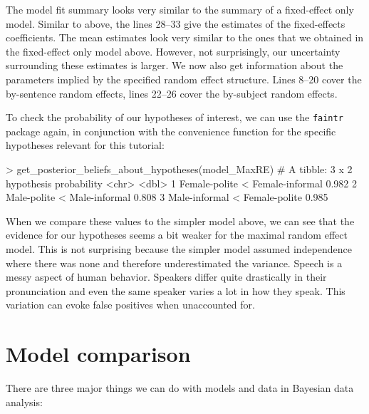 \documentclass[nobib]{tufte-handout}
\begin{document}
The model fit summary looks very similar to the summary of a fixed-effect only model. Similar to above, the lines 28--33 give the estimates of the fixed-effects coefficients. The mean estimates look very similar to the ones that we obtained in the fixed-effect only model above. However, not surprisingly, our uncertainty surrounding these estimates is larger.  
We now also get information about the parameters implied by the specified random effect
structure. Lines 8--20 cover the by-sentence random effects, lines 22--26 cover the by-subject
random effects.

To check the probability of our hypotheses of interest, we can use the \texttt{faintr} package again, in conjunction with the convenience function for the specific hypotheses relevant for this tutorial:

\medskip

\begin{minipage}[]{\textwidth}
\begin{rc}
> get_posterior_beliefs_about_hypotheses(model_MaxRE)
# A tibble: 3 x 2
  hypothesis                      probability
  <chr>                                 <dbl>
1 Female-polite < Female-informal       0.982
2 Male-polite < Male-informal           0.808
3 Male-informal < Female-polite         0.985
\end{rc}
\end{minipage}

When we compare these values to the simpler model above, we can see that the evidence for our
hypotheses seems a bit weaker for the maximal random effect model. This is not surprising
because the simpler model assumed independence where there was none and therefore
underestimated the variance. Speech is a messy aspect of human behavior. Speakers differ quite
drastically in their pronunciation and even the same speaker varies a lot in how they speak.
This variation can evoke false positives when unaccounted for.

\section{Model comparison}


There are three major things we can do with models and data in Bayesian data analysis:
\end{document}
